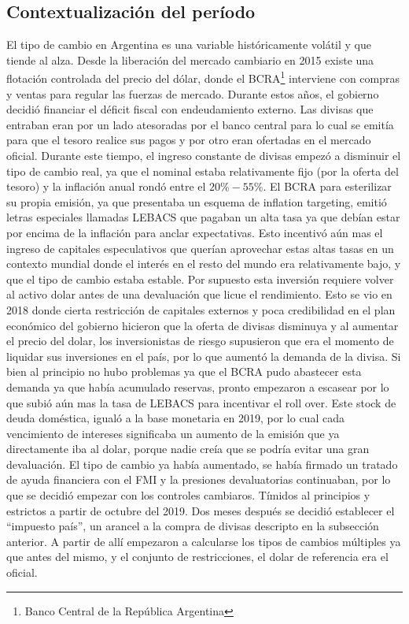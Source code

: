 \documentclass[11pt,a4paper]{article}
\begin{document}
\subsection{Contextualización del período}
El tipo de cambio en Argentina es una variable históricamente volátil y que tiende al alza. Desde la liberación del mercado cambiario en 2015 existe una flotación controlada del precio del dólar, donde el BCRA\footnote{Banco Central de la República Argentina} interviene con compras y ventas para regular las fuerzas de mercado. Durante estos años, el gobierno decidió financiar el déficit fiscal con endeudamiento externo. Las divisas que entraban eran por un lado atesoradas por el banco central para lo cual se emitía para que el tesoro realice sus pagos y por otro eran ofertadas en el mercado oficial. Durante este tiempo, el ingreso constante de divisas empezó a disminuir el tipo de cambio real, ya que el nominal estaba relativamente fijo (por la oferta del tesoro) y la inflación anual rondó entre el $20 \% - 55 \%$. El BCRA para esterilizar su propia emisión, ya que presentaba un esquema de inflation targeting, emitió letras especiales llamadas LEBACS que pagaban un alta tasa ya que debían estar por encima de la inflación para anclar expectativas. Esto incentivó aún mas el ingreso de capitales especulativos que querían aprovechar estas altas tasas en un contexto mundial donde el interés en el resto del mundo era relativamente bajo, y que el tipo de cambio estaba estable. Por supuesto esta inversión requiere volver al activo dolar antes de una devaluación que licue el rendimiento. Esto se vio en 2018 donde cierta restricción de capitales externos y poca credibilidad en el plan económico del gobierno hicieron que la oferta de divisas disminuya y al aumentar el precio del dolar, los inversionistas de riesgo supusieron que era el momento de liquidar sus inversiones en el país, por lo que aumentó la demanda de la divisa. Si bien al principio no hubo problemas ya que el BCRA pudo abastecer esta demanda ya que había acumulado reservas, pronto empezaron a escasear por lo que subió aún mas la tasa de LEBACS para incentivar el roll over. Este stock de deuda doméstica, igualó a la base monetaria en 2019, por lo cual cada vencimiento de intereses significaba un aumento de la emisión que ya directamente iba al dolar, porque nadie creía que se podría evitar una gran devaluación. El tipo de cambio ya había aumentado, se había firmado un tratado de ayuda financiera con el FMI y la presiones devaluatorias continuaban, por lo que se decidió empezar con los controles cambiaros. Tímidos al principios y estrictos a partir de octubre del 2019. Dos meses después se decidió establecer el ``impuesto país'', un arancel a la compra de divisas descripto en la subsección anterior. A partir de allí empezaron a calcularse los tipos de cambios múltiples ya que antes del mismo, y el conjunto de restricciones, el dolar de referencia era el oficial. 
\end{document}
